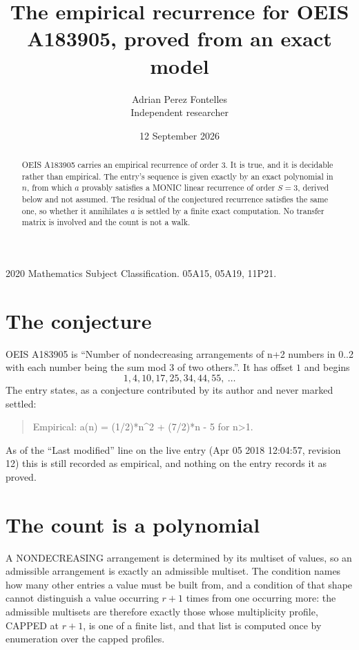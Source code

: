 \documentclass[11pt,a4paper]{article}
\title{The empirical recurrence for OEIS A183905, proved from an exact model}
\author{Adrian Perez Fontelles\\ \small Independent researcher}
\date{12 September 2026}
\theoremstyle{plain}
\theoremstyle{definition}
\begin{document}
\maketitle

\begin{abstract}
OEIS A183905 carries an empirical recurrence of order $3$. It is true, and it is
decidable rather than empirical. The entry's sequence is given exactly by an exact polynomial in $n$, from
which $a$ provably satisfies a MONIC linear recurrence of order $S=3$, derived below and not
assumed. The residual of the conjectured recurrence satisfies the same one, so whether it
annihilates $a$ is settled by a finite exact computation. No transfer matrix is involved and
the count is not a walk.
\end{abstract}

\noindent\small 2020 Mathematics Subject Classification. 05A15, 05A19, 11P21.\normalsize

\section{The conjecture}

OEIS A183905 is ``Number of nondecreasing arrangements of n+2 numbers in 0..2 with each number being the sum mod 3 of two others.''. It has offset $1$ and begins
\[
1, 4, 10, 17, 25, 34, 44, 55,\ \dots
\]
The entry states, as a conjecture contributed by its author and never marked settled:
\begin{quote}
Empirical: a(n) = (1/2)*n\^{}2 + (7/2)*n - 5 for n>1.
\end{quote}
As of the ``Last modified'' line on the live entry (Apr 05 2018 12:04:57, revision 12)
this is still recorded as empirical, and nothing on the entry records it as proved.

\section{The count is a polynomial}

A NONDECREASING arrangement is determined by its multiset of values, so an admissible
arrangement is exactly an admissible multiset. The condition names how many other entries a
value must be built from, and a condition of that shape cannot distinguish a value occurring
$r+1$ times from one occurring more: the admissible multisets are therefore exactly those
whose multiplicity profile, CAPPED at $r+1$, is one of a finite list, and that list is computed
once by enumeration over the capped profiles.
\end{document}
